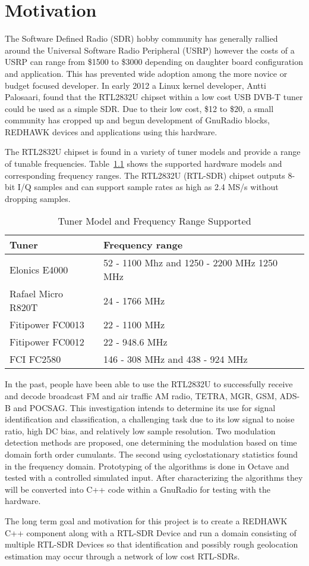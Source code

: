 \chapter{Motivation}

The Software Defined Radio (SDR) hobby community has generally rallied around
the Universal Software Radio Peripheral (USRP) however the costs of a USRP can
range from \$1500 to \$3000 depending on daughter board configuration and
application.  This has prevented wide adoption among the more novice or budget
focused developer. In early 2012 a Linux kernel developer, Antti Palosaari, found
that the RTL2832U chipset within a low cost USB DVB-T tuner
could be used as a simple SDR.  Due to their low cost, \$12 to \$20, a
small community has cropped up and begun development of GnuRadio blocks, REDHAWK
devices and applications using this hardware.

The RTL2832U chipset is found in a variety of tuner models and provide a range
of tunable frequencies.
Table~\ref{tab:ModelAndFreq} shows the supported hardware models and
corresponding frequency ranges.  The RTL2832U (RTL-SDR) chipset outputs 8-bit
I/Q samples and can support sample rates as high as 2.4 MS/s without dropping samples.  

\begin{table}
\caption{Tuner Model and Frequency Range Supported}
\begin{tabular}{| l | l |} \hline
Tuner	& Frequency range \\ \hline
Elonics E4000	& 52 - 1100 Mhz and 1250 - 2200 MHz 1250 MHz \\ \hline
Rafael Micro R820T &	24 - 1766 MHz \\ \hline
Fitipower FC0013 & 22 - 1100 MHz  \\ \hline
Fitipower FC0012 &	22 - 948.6 MHz \\ \hline
FCI FC2580	& 146 - 308 MHz and 438 - 924 MHz \\ \hline
\end{tabular}
\label{tab:ModelAndFreq}
\end{table}

In the past, people have been able to use the RTL2832U to successfully
receive and decode broadcast FM and air traffic AM radio, TETRA, MGR, GSM, ADS-B
and POCSAG.  This investigation intends to determine its use for signal
identification and classification, a challenging task due to its low signal to
noise ratio, high DC bias, and relatively low sample resolution.  Two
modulation detection methods are proposed, one determining the modulation
based on time domain forth order cumulants.  The second using cyclostationary
statistics found in the frequency domain.  Prototyping of the algorithms
is done in Octave and tested with a controlled simulated input. 
After characterizing the algorithms they will be converted into C++ code
within a GnuRadio for testing with the hardware. 

The long term goal and motivation for this project is to create a REDHAWK C++
component along with a RTL-SDR Device and run a domain consisting of multiple
RTL-SDR Devices so that identification and possibly rough geolocation 
estimation may occur through a network of low cost RTL-SDRs.

